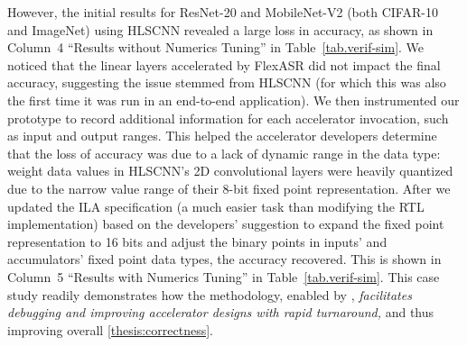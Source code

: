 %
% 


%

However, the initial results for ResNet-20 and MobileNet-V2
  (both CIFAR-10 and ImageNet)
  using HLSCNN
  revealed a large loss in accuracy, 
  {as shown in Column~4 ``Results without Numerics Tuning'' in Table~\ref{tab.verif-sim}}.
We noticed that the linear layers 
  accelerated by FlexASR 
  did not impact the final accuracy,
  suggesting the issue stemmed from HLSCNN
  (for which this was also the first time it was run in an end-to-end application).
We then instrumented
  our {\TLA} prototype 
  to record additional information
  for each accelerator invocation,
  such as input and output ranges.
This helped 
  the accelerator developers
  determine that the loss of accuracy
  was due to a lack of dynamic range in the data type:
  weight data values 
  in HLSCNN's 2D convolutional layers
  were heavily quantized
  due to the narrow value range
  of their 8-bit fixed point representation.
After we updated the ILA specification (a much easier task than modifying the RTL implementation) based on the developers' suggestion to expand the fixed point representation to 16 bits and adjust the binary points in inputs' and accumulators' fixed point data types, the %
accuracy recovered.
{This is shown in Column~5 ``Results with Numerics Tuning'' in Table~\ref{tab.verif-sim}.}
This case study readily demonstrates
  how the {\TLA} methodology,
  enabled by \g,
  \textit{facilitates debugging and improving accelerator designs
  with rapid turnaround,} and thus improving overall
  \cref{thesis:correctness}.

